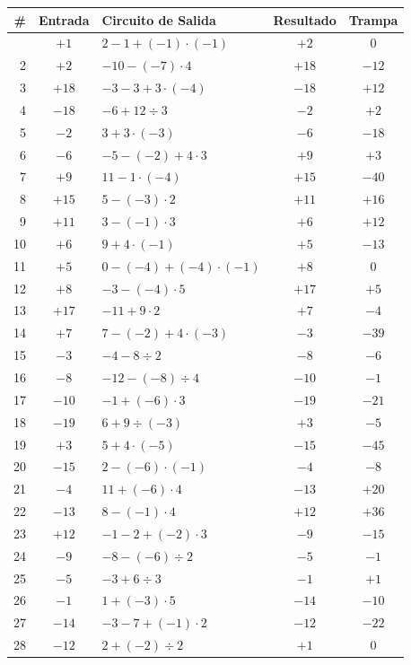 \documentclass[12pt, letterpaper]{article}
\begin{document}
{\small
\begin{longtable}{@{}r c l c c@{}}
\toprule
\textbf{\#} & \textbf{Entrada} & \textbf{Circuito de Salida} & \textbf{Resultado} & \textbf{Trampa}\\
\midrule
\endhead
\bottomrule
\endfoot
1 & $+1$ & $2-1+(-1)\cdot(-1)$ & $+2$ & $0$\\
2 & $+2$ & $-10-(-7)\cdot 4$ & $+18$ & $-12$\\
3 & $+18$ & $-3-3+3\cdot(-4)$ & $-18$ & $+12$\\
4 & $-18$ & $-6+12\div 3$ & $-2$ & $+2$\\
5 & $-2$ & $3+3\cdot(-3)$ & $-6$ & $-18$\\
6 & $-6$ & $-5-(-2)+4\cdot 3$ & $+9$ & $+3$\\
7 & $+9$ & $11-1\cdot(-4)$ & $+15$ & $-40$\\
8 & $+15$ & $5-(-3)\cdot 2$ & $+11$ & $+16$\\
9 & $+11$ & $3-(-1)\cdot 3$ & $+6$ & $+12$\\
10 & $+6$ & $9+4\cdot(-1)$ & $+5$ & $-13$\\
11 & $+5$ & $0-(-4)+(-4)\cdot(-1)$ & $+8$ & $0$\\
12 & $+8$ & $-3-(-4)\cdot 5$ & $+17$ & $+5$\\
13 & $+17$ & $-11+9\cdot 2$ & $+7$ & $-4$\\
14 & $+7$ & $7-(-2)+4\cdot(-3)$ & $-3$ & $-39$\\
15 & $-3$ & $-4-8\div 2$ & $-8$ & $-6$\\
16 & $-8$ & $-12-(-8)\div 4$ & $-10$ & $-1$\\
17 & $-10$ & $-1+(-6)\cdot 3$ & $-19$ & $-21$\\
18 & $-19$ & $6+9\div(-3)$ & $+3$ & $-5$\\
19 & $+3$ & $5+4\cdot(-5)$ & $-15$ & $-45$\\
20 & $-15$ & $2-(-6)\cdot(-1)$ & $-4$ & $-8$\\
21 & $-4$ & $11+(-6)\cdot 4$ & $-13$ & $+20$\\
22 & $-13$ & $8-(-1)\cdot 4$ & $+12$ & $+36$\\
23 & $+12$ & $-1-2+(-2)\cdot 3$ & $-9$ & $-15$\\
24 & $-9$ & $-8-(-6)\div 2$ & $-5$ & $-1$\\
25 & $-5$ & $-3+6\div 3$ & $-1$ & $+1$\\
26 & $-1$ & $1+(-3)\cdot 5$ & $-14$ & $-10$\\
27 & $-14$ & $-3-7+(-1)\cdot 2$ & $-12$ & $-22$\\
28 & $-12$ & $2+(-2)\div 2$ & $+1$ & $0$\\
\end{longtable}
}
\end{document}
